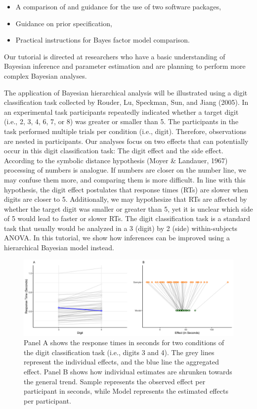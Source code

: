 \documentclass[
  english,
  doc,floatsintext]{apa6}
\providecommand{\tightlist}{%
  \setlength{\itemsep}{0pt}\setlength{\parskip}{0pt}}
\begin{document}
\begin{itemize}
\tightlist
\item
  A comparison of and guidance for the use of two software packages,
\item
  Guidance on prior specification,
\item
  Practical instructions for Bayes factor model comparison.
\end{itemize}

Our tutorial is directed at researchers who have a basic understanding of Bayesian inference and parameter estimation and are planning to perform more complex Bayesian analyses.

The application of Bayesian hierarchical analysis will be illustrated using a digit classification task collected by Rouder, Lu, Speckman, Sun, and Jiang (2005). In an experimental task participants repeatedly indicated whether a target digit (i.e., 2, 3, 4, 6, 7, or 8) was greater or smaller than 5. The participants in the task performed multiple trials per condition (i.e., digit). Therefore, observations are nested in participants. Our analyses focus on two effects that can potentially occur in this digit classification task: The digit effect and the side effect. According to the symbolic distance hypothesis (Moyer \& Landauer, 1967) processing of numbers is analogue. If numbers are closer on the number line, we may confuse them more, and comparing them is more difficult. In line with this hypothesis, the digit effect postulates that response times (RTs) are slower when digits are closer to 5. Additionally, we may hypothesize that RTs are affected by whether the target digit was smaller or greater than 5, yet it is unclear which side of 5 would lead to faster or slower RTs. The digit classification task is a standard task that usually would be analyzed in a 3 (digit) by 2 (side) within-subjects ANOVA. In this tutorial, we show how inferences can be improved using a hierarchical Bayesian model instead.

\begin{figure}[H]

\includegraphics[width=0.95\linewidth]{Images/Fig1_meanrtandhierplot_v2} \hfill{}

\caption{Panel A shows the response times in seconds for two conditions of the digit classification task (i.e., digits 3 and 4). The grey lines represent the individual effects, and the blue line the aggregated effect. Panel B shows how individual estimates are shrunken towards the general trend. Sample represents the observed effect per participant in seconds, while Model represents the estimated effects per participant. }\label{fig:figure1}
\end{figure}
\end{document}
